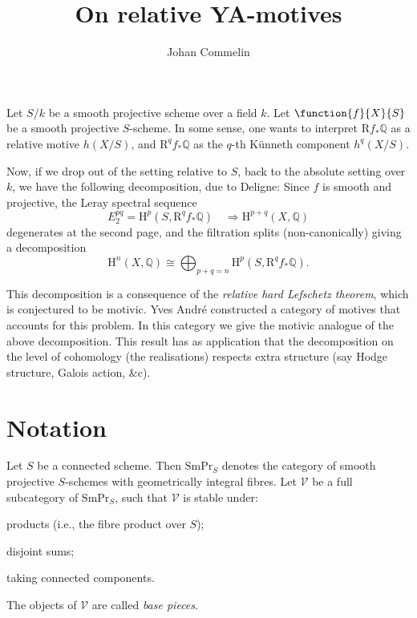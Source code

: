 \documentclass[a4paper,10pt]{article}
\title{On relative YA-motives}
\author{Johan Commelin}
\def\basepieces{\mathscr{V}}
\def\smpr{\mathrm{SmPr}}
\def\coh{\mathrm{H}}
\begin{document}
\maketitle

Let $S/k$ be a smooth projective scheme over a field $k$. Let
$\function{f}{X}{S}$ be a smooth projective $S$-scheme. In some sense, one
wants to interpret $\mathrm{R}f_{*}\mathbb{Q}$ as a relative motive $h(X/S)$,
and $\mathrm{R}^{q}f_{*}\mathbb{Q}$ as the $q$-th K\"{u}nneth component
$h^{q}(X/S)$.

Now, if we drop out of the setting relative to $S$, back to the absolute
setting over $k$, we have the following decomposition, due to Deligne:
Since $f$ is smooth and projective, the Leray spectral sequence
\[
	E_{2}^{pq} = \coh^{p}(S, \mathrm{R}^{q}f_{*}\mathbb{Q})
	\quad \Rightarrow \coh^{p+q}(X, \mathbb{Q})
\]
degenerates at the second page, and the filtration splits (non-canonically)
giving a decomposition
\[
	\coh^{n}(X, \mathbb{Q}) \cong \bigoplus_{p+q = n}
	\coh^{p}(S, \mathrm{R}^{q}f_{*}\mathbb{Q}).
\]

This decomposition is a consequence of the \emph{relative hard Lefschetz
theorem}, which is conjectured to be motivic. Yves Andr\'{e} constructed a
category of motives that accounts for this problem. In this category we give
the motivic analogue of the above decomposition. This result has as application
that the decomposition on the level of cohomology (the realisations) respects
extra structure (say Hodge structure, Galois action, \&c).

\section{Notation}

Let $S$ be a connected scheme. Then $\smpr_{S}$ denotes the category of smooth
projective $S$-schemes with geometrically integral fibres.
Let $\basepieces$ be
a full subcategory of $\smpr_{S}$, such that $\basepieces$ is stable under:
\begin{enumerate*}[label=(\alph*)] %
	\item products (i.e., the fibre product over $S$);
	\item disjoint sums;
	\item taking connected components.
\end{enumerate*} %
The objects of $\basepieces$ are called \emph{base pieces}.
\end{document}
